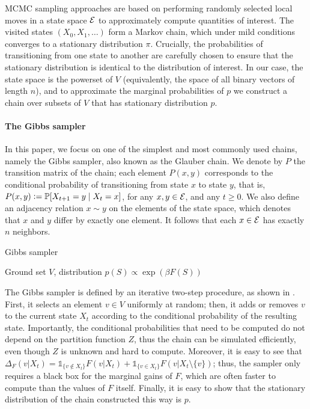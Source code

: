 MCMC sampling \cite{levin08} approaches are based on performing randomly selected local moves in a state space $\ss$ to approximately compute quantities of interest.
The visited states $(X_0, X_1,\ldots)$ form a Markov chain, which under mild conditions converges to a stationary distribution $\pi$.
Crucially, the probabilities of transitioning from one state to another are carefully chosen to ensure that the stationary distribution is identical to the distribution of interest.
In our case, the state space is the powerset of $V$ (equivalently, the space of all binary vectors of length $n$), and to approximate the marginal probabilities of $p$ we construct a chain over subsets of $V$ that has stationary distribution $p$.

\paragraph{The Gibbs sampler}
In this paper, we focus on one of the simplest and most commonly used chains, namely the Gibbs sampler, also known as the Glauber chain.
We denote by $P$ the transition matrix of the chain; each element $P(x, y)$ corresponds to the conditional probability of transitioning from state $x$ to state $y$, that is, $P(x, y) \defeq \P[X_{t+1} = y \mid X_{t} = x]$, for any $x, y \in \ss$, and any $t \geq 0$.
We also define an adjacency relation $x \sim y$ on the elements of the state space, which denotes that $x$ and $y$ differ by exactly one element.
It follows that each $x \in \ss$ has exactly $n$ neighbors.

\begin{algorithm}[tb]
	\caption{Gibbs sampler}
	\label{alg:gibbs}
	\small{
		\begin{algorithmic}[1]
			\REQUIRE Ground set $V$, distribution $p(S) \propto \exp(\beta F(S))$
			\ENDFOR
		\end{algorithmic}
	}
\end{algorithm}

The Gibbs sampler is defined by an iterative two-step procedure, as shown in .
First, it selects an element $v \in V$ uniformly at random; then, it adds or removes $v$ to the current state $X_t$ according to the conditional probability of the resulting state.
Importantly, the conditional probabilities that need to be computed do not depend on the partition function $Z$, thus the chain can be simulated efficiently, even though $Z$ is unknown and hard to compute.
Moreover, it is easy to see that $\Delta_F(v | X_t) = \mathds{1}_{\{v\not\in X_t\}}F(v|X_t) + \mathds{1}_{\{v\in X_t\}}F(v|X_t\setminus\{v\})$; thus, the sampler only requires a black box for the marginal gains of $F$, which are often faster to compute than the values of $F$ itself.
Finally, it is easy to show that the stationary distribution of the chain constructed this way is $p$.

